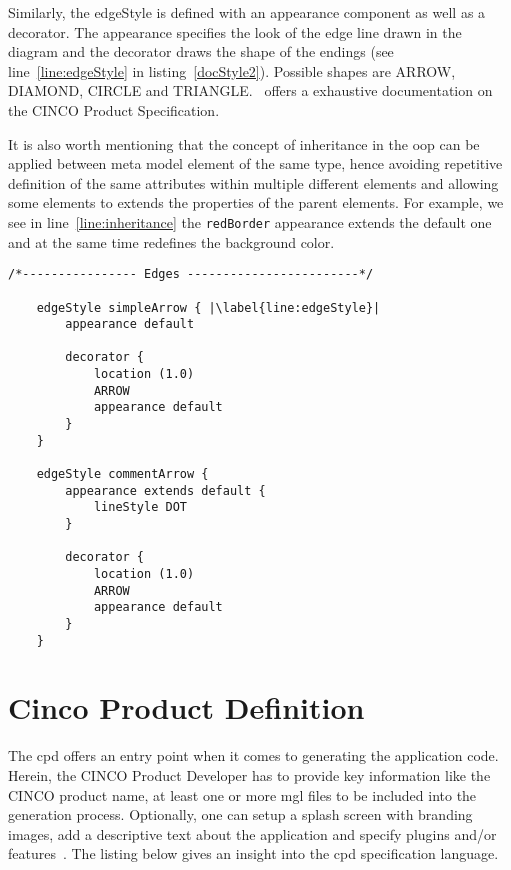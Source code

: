 Similarly, the edgeStyle is defined with an appearance component as well as a decorator. The appearance specifies the look of the edge line drawn in the diagram and the decorator draws the shape of the endings (see line~\ref{line:edgeStyle} in listing~\ref{docStyle2}). Possible shapes are ARROW, DIAMOND, CIRCLE and TRIANGLE\@.~\cite{gitlabcinco} offers a exhaustive documentation on the CINCO Product Specification.

It is also worth mentioning that the concept of inheritance in the \acrfull{oop} can be applied between meta model element of the same type, hence avoiding repetitive definition of the same attributes within multiple different elements and allowing some elements to extends the properties of the parent elements. For example, we see in line~\ref{line:inheritance} the \lstinline{redBorder} appearance extends the default one and at the same time redefines the background color.

\begin{lstlisting}[language=MGL, caption={Doc.style part 2}, label=docStyle2, escapechar=|, name=docMSL]
    /*---------------- Edges ------------------------*/

    edgeStyle simpleArrow { |\label{line:edgeStyle}|
        appearance default

        decorator {
            location (1.0)
            ARROW
            appearance default
        }
    }

    edgeStyle commentArrow {
        appearance extends default {
            lineStyle DOT
        }

        decorator {
            location (1.0)
            ARROW
            appearance default
        }
    }
\end{lstlisting}

\section{Cinco Product Definition}\label{sec:CPD}

The \acrfull{cpd} offers an entry point when it comes to generating the application code. Herein, the CINCO Product Developer has to provide key information like the CINCO product name, at least one or more \acrshort{mgl} files to be included into the generation process. Optionally, one can setup a splash screen with branding images, add a descriptive text about the application and specify plugins and/or features~\cite{gitlabcinco}.
The listing below gives an insight into the \acrshort{cpd} specification language.

